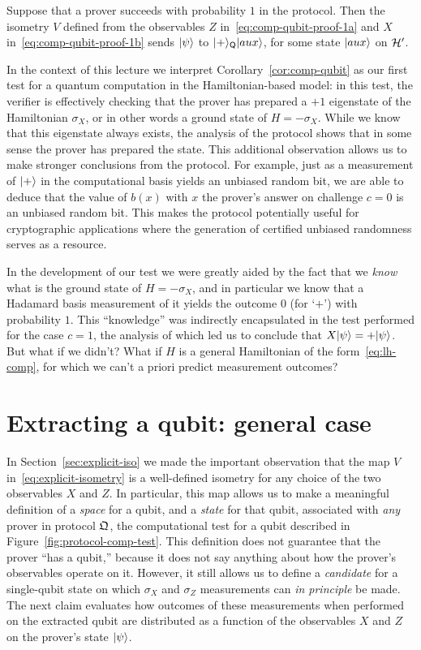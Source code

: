 \begin{corollary}\label{cor:comp-qubit}
Suppose that a prover succeeds with probability $1$ in the protocol. Then the isometry $V$ defined from the observables  $Z$ in~\eqref{eq:comp-qubit-proof-1a} and $X$ in~\eqref{eq:comp-qubit-proof-1b} sends $|\psi\rangle$ to $|+\rangle_{\textsf{Q}}|aux\rangle$, for some state $|aux\rangle$ on $\mathcal{H}'$.
\end{corollary}

In the context of this lecture we interpret Corollary~\ref{cor:comp-qubit} as our first test for a quantum computation in the Hamiltonian-based model: in this test, the verifier is effectively checking that the prover has prepared a $+1$ eigenstate of the Hamiltonian $\sigma_X$, or in other words a ground state of $H=-\sigma_X$. While we know that this eigenstate always exists, the analysis of the protocol shows that in some sense the prover has prepared the state. This additional observation allows us to make stronger conclusions from the protocol. For example, just as a measurement of $|+\rangle$ in the computational basis yields an unbiased random bit, we are able to deduce that the value of $b(x)$ with $x$ the prover's answer on challenge $c=0$ is an unbiased random bit. This makes the protocol potentially useful for cryptographic applications where the generation of certified unbiased randomness serves as a resource.  

In the development of our test we were greatly aided by the fact that we \emph{know} what is the ground state of $H = -\sigma_X$, and in particular we know that a Hadamard basis measurement of it yields the outcome $0$ (for `$+$') with probability $1$. This ``knowledge'' was indirectly encapsulated in the test performed for the case $c=1$, the analysis of which led us to conclude that $X |\psi\rangle = + |\psi\rangle$. 
But what if we didn't? What if $H$ is a general Hamiltonian of the form~\eqref{eq:lh-comp}, for which we can't a priori predict measurement outcomes? 


\section{Extracting a qubit: general case}
\label{sec:extract-comp-qubit}

In Section~\ref{sec:explicit-iso} we made the important observation that the map $V$ in~\eqref{eq:explicit-isometry} is a well-defined isometry for any choice of the two observables $X$ and $Z$. In particular, this map allows us to make a meaningful definition of a \emph{space} for a qubit, and a \emph{state} for that qubit, associated with \emph{any} prover in protocol $\mathfrak{Q}$, the computational test for a qubit described in Figure~\ref{fig:protocol-comp-test}. This definition does not guarantee that the prover ``has a qubit,'' because it does not say anything about how the prover's observables operate on it. 
 However, it still allows us to define a \emph{candidate} for a single-qubit state on which $\sigma_X$ and $\sigma_Z$ measurements can \emph{in principle} be made. The next claim evaluates how outcomes of these measurements when performed on the extracted qubit are distributed as a function of the observables $X$ and $Z$ on the prover's state $|\psi\rangle$. 

